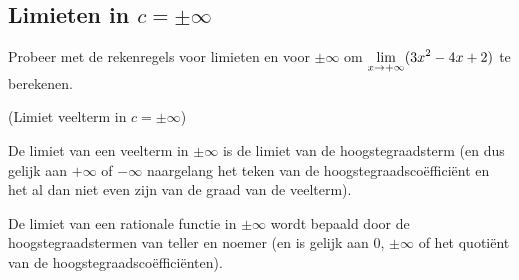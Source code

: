 \documentclass{ximera}
\begin{document}
\subsection{Limieten in $c=\pm\infty$ }


\begin{exercise}
Probeer met de rekenregels voor limieten en voor $\pm\infty$ om $\limxi (3x^2-4x+2)$ te berekenen.



\end{exercise}

\begin{proposition} (Limiet veelterm in $c=\pm\infty$)

De limiet van een veelterm in $\pm\infty$ is de limiet van de hoogstegraadsterm (en dus gelijk aan $+\infty$ of $-\infty$ naargelang het teken van de hoogstegraadscoëfficiënt en het al dan niet even zijn van de graad van de veelterm).

De limiet van een rationale functie in $\pm\infty$ wordt bepaald door de hoogstegraadstermen van teller en noemer (en is gelijk aan $0$, $\pm\infty$ of het quotiënt van de hoogstegraadscoëfficiënten).
\end{proposition}
\end{document}
